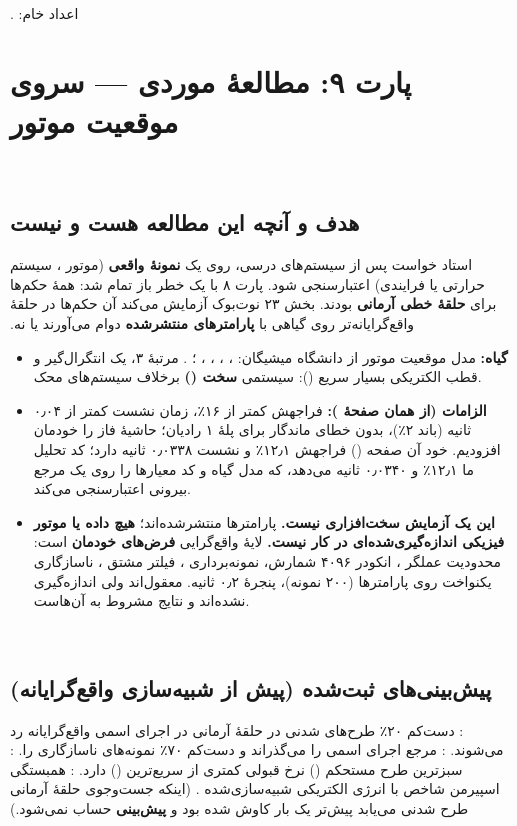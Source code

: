 ‫\documentclass[a4paper,12pt]{article}
\begin{document}
‫اعداد خام: \texttt{}.
‫
‫
‫\section{پارت ۹: مطالعهٔ موردی --- سروی موقعیت موتور }
‫
‫\subsection{هدف و آنچه این مطالعه هست و نیست}
‫استاد خواست پس از سیستم‌های درسی، روی یک \textbf{نمونهٔ واقعی} (موتور ، سیستم حرارتی یا فرایندی) اعتبارسنجی شود. پارت ۸ با یک خطر باز تمام شد: همهٔ حکم‌ها برای \textbf{حلقهٔ خطی آرمانی} بودند. بخش ۲۳ نوت‌بوک آزمایش می‌کند آن حکم‌ها در حلقهٔ واقع‌گرایانه‌تر روی گیاهی با \textbf{پارامترهای منتشرشده} دوام می‌آورند یا نه.
‫\begin{itemize}
‫\item \textbf{گیاه:} مدل موقعیت موتور  از  دانشگاه میشیگان: ، ، ، ، ؛ . مرتبهٔ ۳، یک انتگرال‌گیر و قطب الکتریکی بسیار سریع (): سیستمی \textbf{سخت ()} برخلاف سیستم‌های محک.
‫\item \textbf{الزامات (از همان صفحهٔ ):} فراجهش کمتر از ۱۶٪، زمان نشست کمتر از ۰٫۰۴ ثانیه (باند ۲٪)، بدون خطای ماندگار برای پلهٔ ۱ رادیان؛ حاشیهٔ فاز  را خودمان افزودیم.  خود آن صفحه () فراجهش ۱۲٫۱٪ و نشست ۰٫۰۳۳۸ ثانیه دارد؛ کد تحلیل ما ۱۲٫۱٪ و ۰٫۰۳۴۰ ثانیه می‌دهد، که مدل گیاه و کد معیارها را روی یک مرجع بیرونی اعتبارسنجی می‌کند.
‫\item \textbf{این یک آزمایش سخت‌افزاری نیست.} پارامترها منتشرشده‌اند؛ \textbf{هیچ داده یا موتور فیزیکی اندازه‌گیری‌شده‌ای در کار نیست.} لایهٔ واقع‌گرایی \textbf{فرض‌های خودمان} است: محدودیت عملگر ، انکودر ۴۰۹۶ شمارش، نمونه‌برداری ، فیلتر مشتق ، ناسازگاری یکنواخت  روی پارامترها (۲۰۰ نمونه)، پنجرهٔ ۰٫۲ ثانیه. معقول‌اند ولی اندازه‌گیری نشده‌اند و نتایج مشروط به آن‌هاست.
‫\end{itemize}
‫
‫\subsection{پیش‌بینی‌های ثبت‌شده (پیش از شبیه‌سازی واقع‌گرایانه)}
‫: دست‌کم ۲۰٪ طرح‌های شدنی در حلقهٔ آرمانی در اجرای اسمی واقع‌گرایانه رد می‌شوند. :  مرجع  اجرای اسمی را می‌گذراند و دست‌کم ۷۰٪ نمونه‌های ناسازگاری را. : سبزترین طرح مستحکم () نرخ قبولی کمتری از سریع‌ترین () دارد. : همبستگی اسپیرمن شاخص  با انرژی الکتریکی شبیه‌سازی‌شده . (اینکه جست‌وجوی حلقهٔ آرمانی طرح شدنی می‌یابد پیش‌تر یک بار کاوش شده بود و \textbf{پیش‌بینی} حساب نمی‌شود.)
\end{document}
